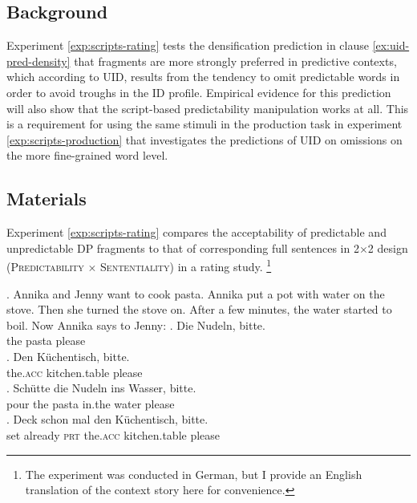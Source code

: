 \subsection{Background}
Experiment \ref{exp:scripts-rating} tests the densification prediction in clause \ref{ex:uid-pred-density} that fragments are more strongly preferred in predictive contexts, which according to UID, results from the tendency to omit predictable words in order to avoid troughs in the ID profile. Empirical evidence for this prediction will also show that the script-based predictability manipulation works at all. This is a requirement for using the same stimuli in the production task in experiment \ref{exp:scripts-production} that investigates the predictions of UID on omissions on the more fine-grained word level. 

\subsection{Materials}\label{sec:scripts-rating-materials}

Experiment \ref{exp:scripts-rating} compares the acceptability of predictable and unpredictable DP fragments \Next[a,b] to that of corresponding full sentences \Next[c,d] in  2$\times$2 design (\textsc{Pre\-dictability} $\times$ \textsc{Sententiality}) in a rating study.%
%
\footnote{The experiment was conducted in German, but I provide an English translation of the context story here for convenience.}\afterfn%
%

\ex. Annika and Jenny want to cook pasta. Annika put a pot with water on the stove. Then she turned the stove on. After a few minutes, the water started to boil. Now Annika says to Jenny: \label{ex:scripts-rating-item}
     \ag.  Die Nudeln, bitte.\\
	  the pasta please\\
	   
     \bg. Den Küchentisch, bitte.\\
	  the.\textsc{acc} kitchen.table please\\
	   
     \cg. Schütte die Nudeln ins Wasser, bitte.\\
	  pour the pasta in.the water please\\
     \dg. Deck schon mal den Küchentisch, bitte.\\
	  set already \textsc{prt} the.\textsc{acc} kitchen.table please\\

